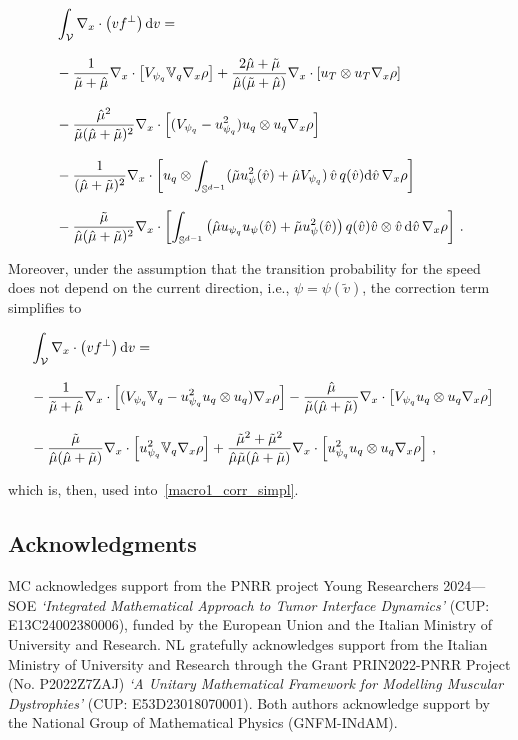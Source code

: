 \documentclass[a4paper]{article}
\theoremstyle{Theorem}\newtheorem{proposition}{Proposition}[section]
\theoremstyle{Remark}\newtheorem{remark}{Remark}[section]
\theoremstyle{Theorem}\newtheorem{theorem}{Theorem}[section]
\newcommand{\hv}{\hat{v}}
\newcommand{\tv}{\tilde{v}}
\newcommand{\hmu}{\hat{\mu}}
\newcommand{\tmu}{\tilde{\mu}}
\newcommand{\intS}{\int_{\mathbb{S}^{d-1}}}
\newcommand{\intV}{\int_{\mathcal{V}}}
\begin{document}
\begin{allowdisplaybreaks}
\begin{equation*}\label{f_corr2}
    \begin{split}
        &\intV\nabla_x\cdot\left(v f^{\bot}\right){\rm d}v=\\[0.3cm]
        &-\dfrac{1}{\tmu+\hmu}\nabla_x\cdot\left[V_{\psi_q}\mathbb{V}_q\nabla_x\rho\right]+\dfrac{2\hmu+\tmu}{\hmu(\tmu+\hmu)}\nabla_x\cdot\left[u_T\otimes u_T\nabla_x\rho\right]\\[0.3cm]
        &-\dfrac{\hmu^2}{\tmu(\hmu+\tmu)^2}\nabla_x\cdot\left[(V_{\psi_q}-u_{\psi_q}^2) u_q\otimes u_q\nabla_x\rho\right]\\[0.3cm]
        &-\dfrac{1}{(\hmu+\tmu)^2}\nabla_x\cdot\left[u_q\otimes\intS (\tmu u_\psi^2(\hv)+\hmu V_{\psi_q})\,\hv\, q(\hv){\rm d}\hv\,\nabla_x\rho\right]\\[0.3cm]
        &-\dfrac{\tmu}{\hmu(\hmu+\tmu)^2}\nabla_x\cdot\left[\intS \left(\hmu u_{\psi_q} u_\psi(\hv)+\tmu u_\psi^2(\hv)\right) q(\hv)\hv\otimes\hv\,{\rm d}\hv\,\nabla_x\rho\right]\,.
    \end{split}
\end{equation*}
\end{allowdisplaybreaks}
Moreover, under the assumption that the transition probability for the speed does not depend on the current direction, i.e., $\psi=\psi(\tv)$, the correction term simplifies to
\begin{allowdisplaybreaks}
\begin{equation*}\label{f_corr_uncond}
    \begin{split}\
        &\intV\nabla_x\cdot\left(v f^{\bot}\right){\rm d}v=\\[0.3cm]
        &-\dfrac{1}{\tmu+\hmu}\nabla_x\cdot\left[(V_{\psi_q}\mathbb{V}_q-u_{\psi_q}^2u_q\otimes u_q)\nabla_x\rho\right]-\dfrac{\hmu}{\tmu(\hmu+\tmu)}\nabla_x\cdot\left[V_{\psi_q} u_q\otimes u_q\nabla_x\rho\right]\\[0.3cm]
        &-\dfrac{\tmu}{\hmu(\hmu+\tmu)}\nabla_x\cdot\left[u_{\psi_q}^2\mathbb{V}_q\nabla_x\rho\right]+\dfrac{\tmu^2+\tmu^2}{\hmu\tmu(\hmu+\tmu)}\nabla_x\cdot\left[u_{\psi_q}^2u_q\otimes u_q\nabla_x\rho\right]\,,
    \end{split}
\end{equation*}
\end{allowdisplaybreaks}
which is, then, used into~\eqref{macro1_corr_simpl}.



\subsection*{Acknowledgments}
MC acknowledges support from the PNRR project Young Researchers 2024—SOE {\it ‘Integrated Mathematical Approach to Tumor Interface Dynamics’} (CUP: E13C24002380006), funded by the European Union and the Italian Ministry of University and Research. NL gratefully acknowledges support from the Italian Ministry of University and Research through the Grant PRIN2022-PNRR Project (No. P2022Z7ZAJ) {\it ‘A Unitary Mathematical Framework for Modelling Muscular Dystrophies’} (CUP: E53D23018070001). Both authors acknowledge support by the National Group of Mathematical Physics (GNFM-INdAM).
\end{document}

